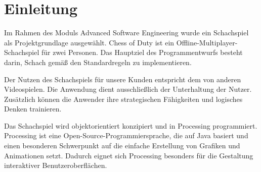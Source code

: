 \chapter{Einleitung}

Im Rahmen des Moduls \glqq Advanced Software Engineering\grqq{} wurde ein Schachspiel als Projektgrundlage ausgewählt. 
Chess of Duty ist ein Offline-Multiplayer-Schachspiel für zwei Personen. 
Das Hauptziel des Programmentwurfs besteht darin, Schach gemäß den Standardregeln zu implementieren. 

Der Nutzen des Schachspiels für unsere Kunden entspricht dem von anderen Videospielen. 
Die Anwendung dient ausschließlich der Unterhaltung der Nutzer. 
Zusätzlich können die Anwender ihre strategischen Fähigkeiten und logisches Denken trainieren.

Das Schachspiel wird objektorientiert konzipiert und in Processing programmiert. 
Processing ist eine Open-Source-Programmiersprache, die auf Java basiert und einen besonderen Schwerpunkt auf die einfache Erstellung von Grafiken und Animationen setzt. 
Dadurch eignet sich Processing besonders für die Gestaltung interaktiver Benutzeroberflächen. 